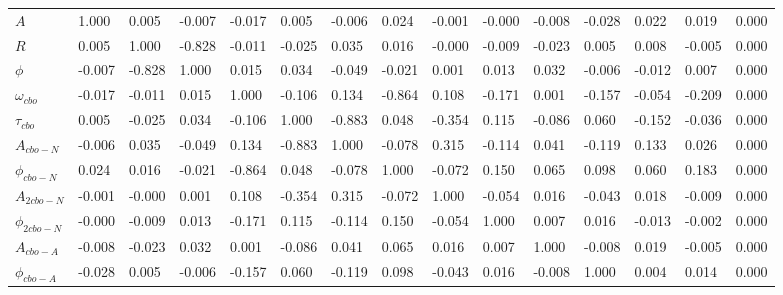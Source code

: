 \begin{landscape}
\begin{table}[]
\setlength\tabcolsep{5pt}
\footnotesize
\begin{tabular*}{\linewidth}{@{\extracolsep{\fill}}lLBLLLLLLLLLLLL}
  \toprule
            &  &  & \thead{$\phi$} &  &  &  &  &  &  &  &  &  &  &  \\
  \midrule
$A$                & 1.000 & 0.005 & -0.007 & -0.017 & 0.005 & -0.006 & 0.024 & -0.001 & -0.000 & -0.008 & -0.028 & 0.022 & 0.019 & 0.000  \\
$R$                & 0.005 & 1.000 & -0.828 & -0.011 & -0.025 & 0.035 & 0.016 & -0.000 & -0.009 & -0.023 & 0.005 & 0.008 & -0.005 & 0.000  \\
$\phi$             & -0.007 & -0.828 & 1.000 & 0.015 & 0.034 & -0.049 & -0.021 & 0.001 & 0.013 & 0.032 & -0.006 & -0.012 & 0.007 & 0.000  \\
$\omega_{cbo}$     & -0.017 & -0.011 & 0.015 & 1.000 & -0.106 & 0.134 & -0.864 & 0.108 & -0.171 & 0.001 & -0.157 & -0.054 & -0.209 & 0.000  \\
$\tau_{cbo}$       & 0.005 & -0.025 & 0.034 & -0.106 & 1.000 & -0.883 & 0.048 & -0.354 & 0.115 & -0.086 & 0.060 & -0.152 & -0.036 & 0.000  \\
$A_{cbo-N}$        & -0.006 & 0.035 & -0.049 & 0.134 & -0.883 & 1.000 & -0.078 & 0.315 & -0.114 & 0.041 & -0.119 & 0.133 & 0.026 & 0.000  \\
$\phi_{cbo-N}$     & 0.024 & 0.016 & -0.021 & -0.864 & 0.048 & -0.078 & 1.000 & -0.072 & 0.150 & 0.065 & 0.098 & 0.060 & 0.183 & 0.000  \\
$A_{2cbo-N}$       & -0.001 & -0.000 & 0.001 & 0.108 & -0.354 & 0.315 & -0.072 & 1.000 & -0.054 & 0.016 & -0.043 & 0.018 & -0.009 & 0.000  \\
$\phi_{2cbo-N}$    & -0.000 & -0.009 & 0.013 & -0.171 & 0.115 & -0.114 & 0.150 & -0.054 & 1.000 & 0.007 & 0.016 & -0.013 & -0.002 & 0.000  \\
$A_{cbo-A}$        & -0.008 & -0.023 & 0.032 & 0.001 & -0.086 & 0.041 & 0.065 & 0.016 & 0.007 & 1.000 & -0.008 & 0.019 & -0.005 & 0.000  \\
$\phi_{cbo-A}$     & -0.028 & 0.005 & -0.006 & -0.157 & 0.060 & -0.119 & 0.098 & -0.043 & 0.016 & -0.008 & 1.000 & 0.004 & 0.014 & 0.000  \\

\end{tabular*}
\end{table}
\end{landscape}
